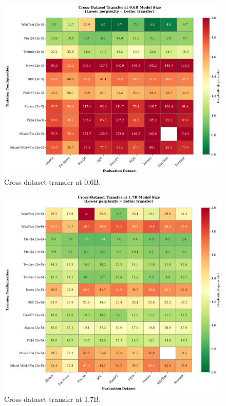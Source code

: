 \begin{figure}[htbp]
\centering
\includegraphics[width=\textwidth]{figures/heatmap_transfer_06b.png}
\caption[Cross-Dataset Transfer at 0.6B]{Cross-dataset transfer at 0.6B.}
\label{fig:heatmap_transfer_06b}
\end{figure}

\begin{figure}[htbp]
\centering
\includegraphics[width=\textwidth]{figures/heatmap_transfer_17b.png}
\caption[Cross-Dataset Transfer at 1.7B]{Cross-dataset transfer at 1.7B.}
\label{fig:heatmap_transfer_17b}
\end{figure}

